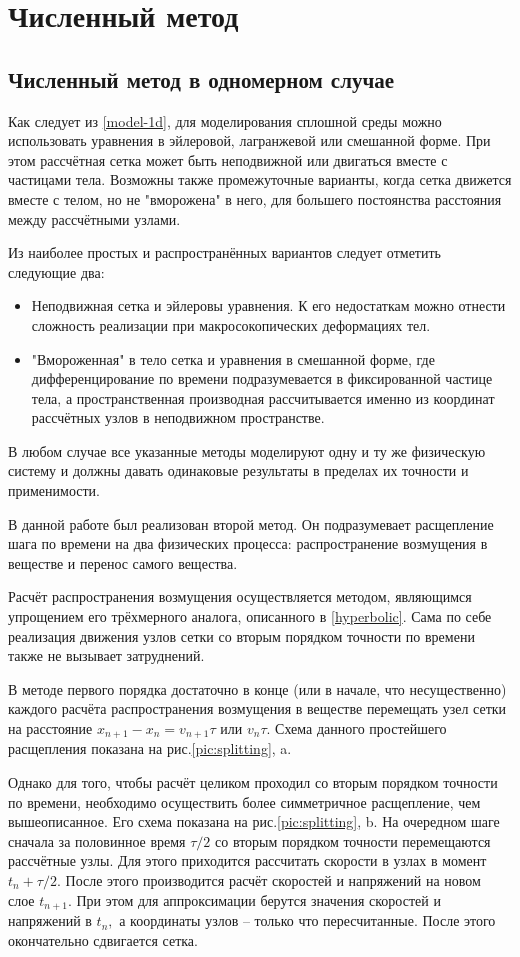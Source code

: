 \section{Численный метод}
\subsection{Численный метод в одномерном случае}
Как следует из \ref{model-1d}, для моделирования сплошной среды можно использовать уравнения в эйлеровой, лагранжевой или смешанной форме. При этом рассчётная сетка может быть неподвижной или двигаться вместе с частицами тела. Возможны также промежуточные варианты, когда сетка движется вместе с телом, но не "вморожена" в него, для большего постоянства расстояния между рассчётными узлами.

Из наиболее простых и распространённых вариантов следует отметить следующие два:
\begin{itemize}
\item Неподвижная сетка и эйлеровы уравнения. К его недостаткам можно отнести сложность реализации при макросокопических деформациях тел.
\item "Вмороженная" в тело сетка и уравнения в смешанной форме, где дифференцирование по времени подразумевается в фиксированной частице тела, а пространственная производная рассчитывается именно из координат рассчётных узлов в неподвижном пространстве.
\end{itemize}
В любом случае все указанные методы моделируют одну и ту же физическую систему и должны давать одинаковые результаты в пределах их точности и применимости. 

В данной работе был реализован второй метод. Он подразумевает расщепление шага по времени на два физических процесса: распространение возмущения в веществе и перенос самого вещества. 

Расчёт распространения возмущения осуществляется методом, являющимся упрощением его трёхмерного аналога, описанного в \ref{hyperbolic}. Сама по себе реализация движения узлов сетки со вторым порядком точности по времени также не вызывает затруднений.

В методе первого порядка достаточно в конце (или в начале, что несущественно) каждого расчёта распространения возмущения в веществе перемещать узел сетки на расстояние $x_{n+1} - x_{n} = v_{n+1}\tau$ или $v_{n}\tau$. Схема данного простейшего расщепления показана на рис.\ref{pic:splitting}, a.

Однако для того, чтобы расчёт целиком проходил со вторым порядком точности по времени, необходимо осуществить более симметричное расщепление, чем вышеописанное. Его схема показана на рис.\ref{pic:splitting}, b. На очередном шаге сначала за половинное время $\tau/2$ со вторым порядком точности перемещаются рассчётные узлы. Для этого приходится рассчитать скорости в узлах в момент $t_n + \tau/2.$ После этого производится расчёт скоростей и напряжений на новом слое $t_{n+1}$. При этом для аппроксимации берутся значения скоростей и напряжений в $t_n,$ а координаты узлов -- только что пересчитанные. После этого окончательно сдвигается сетка.

